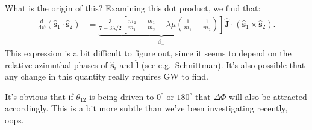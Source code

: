 \documentclass[11pt,
        usenames, %
        dvipsnames %
    ]{article}
\newcommand*{\rd}[2]{\frac{\mathrm{d}#1}{\mathrm{d}#2}}
\newcommand*{\bm}[1]{\boldsymbol{\mathbf{#1}}}
\newcommand*{\uv}[1]{\hat{\bm{#1}}}
\newcommand*{\p}[1]{\left(#1\right)}
\newcommand*{\s}[1]{\left[#1\right]}
\begin{document}
What is the origin of this? Examining this dot product, we find that:
\begin{align}
    \rd{}{\psi}\p{\uv{s}_1 \cdot \uv{s}_2}
        &= \underbrace{\frac{3}{7 - 3\lambda/2}\s{
            \frac{m_2}{m_1} - \frac{m_1}{m_2}
            - \lambda\mu\p{\frac{1}{m_1} - \frac{1}{m_2}}}}_{\beta_-}
            \uv{J} \cdot \p{\uv{s}_1 \times \uv{s}_2}.
\end{align}
This expression is a bit difficult to figure out, since it seems to depend on
the relative azimuthal phases of $\uv{s}_i$ and $\uv{l}$ (see e.g.\ Schnittman).
It's also possible that any change in this quantity really requires GW to find.

It's obvious that if $\theta_{12}$ is being driven to $0^\circ$ or $180^\circ$
that $\Delta \Phi$ will also be attracted accordingly. This is a bit more subtle
than we've been investigating recently, oops.
\end{document}
